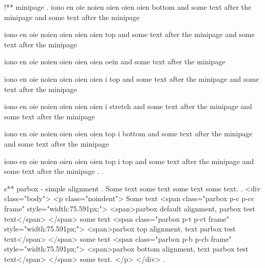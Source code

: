 !** minipage
.
iono en oie noien oien oien oien bottom  and some text after the minipage and some text after the minipage

iono en oie noien oien oien oien top  and some text after the minipage and some text after the minipage


iono en oie noien oien oien oien oein  and some text after the minipage

iono en oie noien oien oien oien i top  and some text after the minipage and some text after the minipage

iono en oie noien oien oien oien i stretch  and some text after the minipage and some text after the minipage

iono en oie noien oien oien oien top i bottom  and some text after the minipage and some text after the minipage

iono en oie noien oien oien oien top i top  and some text after the minipage and some text after the minipage
.
.


s** parbox - simple alignment
.
\noindent
Some text
some text
some text
some text.
.
<div class="body">
<p class="noindent">
Some text <span class="parbox p-c p-cc frame" style="width:75.591px;">
<span>parbox default alignment, parbox test text</span>
</span> some text <span class="parbox p-t p-ct frame" style="width:75.591px;">
<span>parbox top alignment, text parbox test text</span>
</span> some text <span class="parbox p-b p-cb frame" style="width:75.591px;">
<span>parbox bottom alignment, text parbox test text</span>
</span> some text.
</p>
</div>
.


